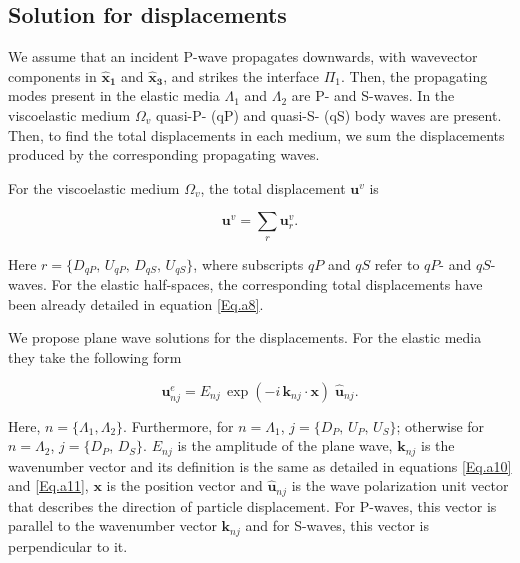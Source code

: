 \documentclass[draft]{agujournal2019}
\begin{document}
\subsection{Solution for displacements}
We assume that an incident P-wave propagates downwards, with wavevector components in $\bm{\hat x_1}$ and  $\bm{\hat x_3}$, and strikes the interface $\Pi_1$. Then, the propagating modes present in the elastic media $\Lambda_1$ and $\Lambda_2$ are P- and S-waves. In the viscoelastic medium $\Omega_v$ quasi-P- (qP)  and quasi-S- (qS) body waves are present. 
Then, to find the total displacements in each medium, we sum the displacements produced by the corresponding propagating waves.

For the viscoelastic medium $\Omega_v$, the total displacement $\bm{u}^v$ is
\begin{linenomath*}
\begin{equation}\label{Eq.b3}
\bm{u}^v=  \sum_r \bm{u}_{r}^v.
\end{equation}
\end{linenomath*}
Here  $r=\{D_{qP},\,U_{qP},\, D_{qS},\,U_{qS}\}$, where subscripts $qP$ and $qS$ refer to $qP$- and $qS$-waves.
For the elastic half-spaces, the corresponding total displacements have been already detailed in equation \eqref{Eq.a8}.

We propose plane wave solutions for the displacements. For the elastic media they take the following form
\begin{linenomath*}
\begin{equation}\label{Eq.b4}
\bm{u}_{nj}^e = E_{nj}\, \exp (- i \,\bm{k}_{nj} \cdot \bm {x} ) \; \bm{\hat {u}}_{nj}.
\end{equation}
\end{linenomath*}

Here, $n=\{ \Lambda_1,\Lambda_2 \}$. Furthermore, for $n =\Lambda_1 $,  $j=\{D_P,\,U_P,\,U_S\}$; otherwise for $n =\Lambda_2 $, $j=\{D_P,\,D_S\}$. $ E_{nj}$ is the amplitude of the plane wave,  $\bm{k}_{nj}$ is the 
wavenumber vector and its definition is the same as detailed in equations \eqref{Eq.a10} and \eqref{Eq.a11},
$\bm {x}$ is the position vector and $\bm{\hat {u}}_{nj}$ is the wave polarization unit vector that describes the direction of particle displacement. For P-waves, this vector is parallel to the wavenumber vector $\bm{k}_{nj}$ and for S-waves, this vector is perpendicular to it.
\end{document}
